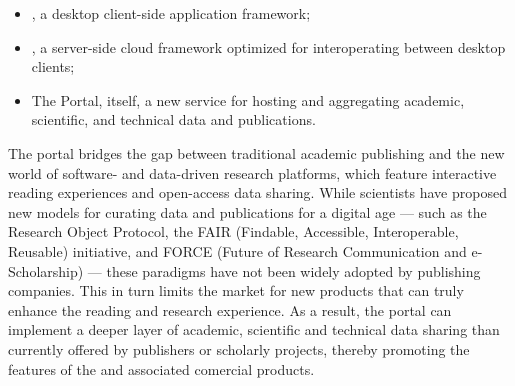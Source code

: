 \documentclass[11pt,letterpaper]{article}
\newenvironment{cframed}{\begin{mdframed}[linecolor=logoPeach,linewidth=0.4mm]}{\end{mdframed}}
\begin{document}
\vspace{.5em}
\begin{cframed}
\begin{itemize}
\vspace*{-.5em}
\item {\VersatileUX}, a desktop client-side application 
framework; 
\vspace*{-.5em}
\item {\NDPCloud}, a server-side cloud framework 
optimized for interoperating between desktop 
clients; 
\vspace*{-.5em}
\item The {\MOSAIC} Portal, itself, a new service for 
hosting and aggregating academic, scientific, and technical 
data and publications.
\end{itemize}
\vspace*{-.5em}
\end{cframed}
\vspace{.5em}
\p{}
The {\MOSAIC} portal bridges the gap between 
traditional academic publishing and the new 
world of software- and data-driven research platforms, 
which feature interactive reading experiences 
and open-access data sharing.  While scientists have 
proposed new models for curating data and publications 
for a digital age --- such as the Research Object Protocol, 
the FAIR (Findable, Accessible, Interoperable, 
Reusable) initiative, and 
FORCE (Future of Research Communication and e-Scholarship) 
--- these paradigms have not been widely adopted by 
publishing companies.  This in turn limits the market 
for new products that can truly enhance the 
reading and research experience.  As a result, 
the {\MOSAIC} portal can implement a deeper layer of 
academic, scientific and technical data sharing 
than currently offered by publishers or scholarly 
projects, thereby promoting the features of 
the {\MOSAIC} {\SDK} and associated comercial products.
\end{document}
